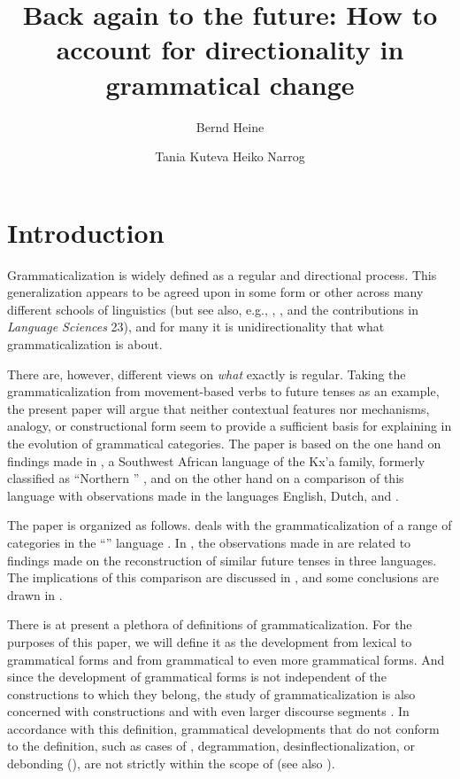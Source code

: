 \documentclass[output=paper]{langsci/langscibook}
\title{Back again to the future: How to account for directionality in grammatical change}
\author{%
 Bernd Heine\affiliation{University of Cologne}\and 
Tania Kuteva\affiliation{University of Düsseldorf}\lastand 
 Heiko Narrog\affiliation{Tohoku University}
}
\begin{document}

\section{Introduction}\label{sec:heine:1}
Grammaticalization is widely defined as a regular and directional process. This generalization appears to be agreed upon in some form or other across many different schools of linguistics (but see also, e.g., \citealt{Newmeyer1998}, \citealt{Norde2009}, and the contributions in \textit{Language Sciences} 23), and for many it is unidirectionality that what grammaticalization is about.



There are, however, different views on \textit{what} exactly is regular. Taking the grammaticalization from movement-based verbs to future tenses as an example, the present paper will argue that neither contextual features nor  mechanisms, analogy, or constructional form seem to provide a sufficient basis for explaining  in the evolution of grammatical categories. The paper is based on the one hand on findings made in , a Southwest African language of the Kx’a family, formerly classified as “Northern ” \citep{Heine2010}, and on the other hand on a comparison of this language with observations made in the  languages English, Dutch, and .



The paper is organized as follows.  deals with the grammaticalization of a range of  categories in the ``'' language . In , the observations made in  are related to findings made on the reconstruction of similar future tenses in three  languages. The implications of this comparison are discussed in , and some conclusions are drawn in .



There is at present a plethora of definitions of grammaticalization. For the purposes of this paper, we will define it as the development from lexical to grammatical forms and from grammatical to even more grammatical forms. And since the development of grammatical forms is not independent of the constructions to which they belong, the study of grammaticalization is also concerned with constructions and with even larger discourse segments \citep[2]{Heine2002}. In accordance with this definition, grammatical developments that do not conform to the definition, such as cases of , degrammation, desinflectionalization, or debonding (\citealt{Norde2009,Norde2014}), are not strictly within the scope of  (see also \citealt[330]{Ramat2015}).
\end{document}
